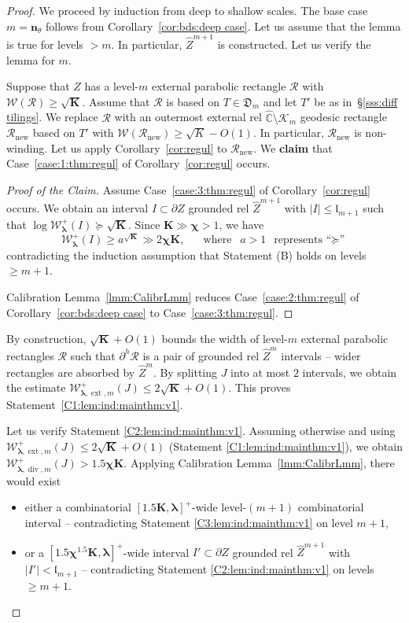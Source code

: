\documentclass{amsart}
\renewcommand{\sp}{{\ \ }}
\newcommand{\1}{{\mathbb 1 }}
\newcommand{\blambda}{{\boldsymbol\lambda}}
\newcommand{\ext}{{\operatorname{ext}}}
\renewcommand{\div}{{\operatorname{div}}}
\newcommand{\Width}{{\mathcal W}}
\newcommand\RR{\mathcal{R}}
\newcommand{\wZ}{{\widehat Z}}
\newcommand{\bK}{{\mathbf K}}
\newcommand{\bbn}{{\mathbf n}}
\newcommand{\length}{{\mathfrak l}}
\newcommand\new{{\operatorname{new}}}
\newcommand{\wC}{\widehat{\mathbb{C}}}
\newcommand{\Dbb}{{\mathfrak{D}}}
\theoremstyle{remark}
\numberwithin{equation}{section}
\theoremstyle{definition}
\newcommand{\filled}{{\mathcal {K} }}
\newcommand{\bchi}{{\boldsymbol{ \chi}}}
\begin{document}
\begin{proof}
We proceed by induction from deep to shallow scales. The base case $m=\bbn_\theta$ follows from Corollary~\ref{cor:bds:deep case}. Let us assume that the lemma is true for levels $>m$. In particular, $\wZ^{m+1}$ is constructed. Let us verify the lemma for $m$.


Suppose that $Z$ has a level-$m$ external parabolic rectangle $\RR$ with $\Width(\RR)\ge \sqrt{\bK}$. Assume that $\RR$ is based on $T\in\Dbb_m$ and let $T'$ be as in~\S\ref{sss:diff tilings}. We replace $\RR$ with an outermost external rel $\wC\setminus \filled_m$ geodesic rectangle $\RR_\new$ based on $T'$ with $\Width(\RR_\new)\ge \sqrt K-O(1)$. In particular, $\RR_\new$ is non-winding. Let us apply Corollary~\ref{cor:regul} to $\RR_\new$. We {\bf claim} that Case~\eqref{case:1:thm:regul} of  Corollary~\ref{cor:regul} occurs.
\begin{proof}[Proof of the Claim]
 Assume Case~\eqref{case:3:thm:regul} of Corollary~\ref{cor:regul} occurs. We obtain an interval $I\subset \partial Z$ grounded rel $\wZ^{m+1}$ with $|I|\le \length_{m+1}$ such that $\log \Width^+_\blambda (I)\succeq \sqrt \bK$. Since $\bK\gg \bchi>1$, we have \[\Width^+_\blambda (I) \ge a^{\sqrt{\bK}}\gg 2 \bchi \bK,\sp\sp\sp \text{ where }\sp  a>1 \sp\text{represents ``$\succeq$''}\]contradicting the induction assumption that Statement (B) holds on levels $\ge m+1$.  
 
 Calibration Lemma~\ref{lmm:CalibrLmm} reduces Case~\eqref{case:2:thm:regul} of Corollary~\ref{cor:bds:deep case} to Case~\eqref{case:3:thm:regul}.
\end{proof}


By construction, $\sqrt\bK+O(1)$ bounds the width of level-$m$ external parabolic rectangles $\RR$ such that $\partial^{h} \RR $ is a pair of grounded rel $\wZ^m$ intervals -- wider rectangles are absorbed by $\wZ^m$. By splitting $J$ into at most $2$ intervals, we obtain the estimate $\Width^+_{\blambda,\ext, m}(J)\le 2\sqrt {\bK}+O(1)$. This proves Statement~\ref{C1:lem:ind:mainthm:v1}.

Let us verify Statement \ref{C2:lem:ind:mainthm:v1}. Assuming otherwise and using $\Width^+_{\blambda,\ext, m}(J)\le 2\sqrt {\bK}+O(1)$ (Statement \ref{C1:lem:ind:mainthm:v1}), we obtain $\Width^+_{\blambda,\div,m}(J)> 1.5 \bchi \bK$. Applying Calibration Lemma~\ref{lmm:CalibrLmm}, there would exist
\begin{itemize}
\item either a combinatorial $[1.5\bK,\blambda]^+$-wide level-$(m+1)$ combinatorial interval -- contradicting Statement \ref{C3:lem:ind:mainthm:v1} on level $m+1$,
\item or a $[1.5\bchi^{1.5} \bK,\blambda]^+$-wide interval $I'\subset \partial Z$ grounded rel $\wZ^{m+1}$ with $|I'|<\length_{m+1}$ -- contradicting Statement \ref{C2:lem:ind:mainthm:v1} on levels $\ge m+1$.
\end{itemize}


\end{proof}
\end{document}
